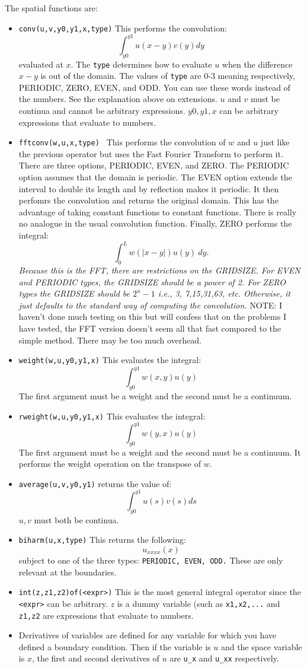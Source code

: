 The spatial  functions are:
\begin{itemize}
\item  {\tt conv(u,v,y0,y1,x,type)} This performs the convolution:
\[
 \int_{y0}^{y1}u(x-y)v(y) dy
\]
evaluated at $x.$  The {\tt type} determines how to evaluate $u$ when
the difference $x-y$ is out of the domain.  The values of {\tt type}
are 0-3 meaning respectively, PERIODIC, ZERO, EVEN, and ODD.  You can
use these words instead of the numbers. 
 See the explanation above on extensions.
$u$ and $v$ must be
continua and cannot be arbitrary expressions. $y0,y1,x$ can be
arbitrary expressions that evaluate to numbers.
\item { \tt fftconv(w,u,x,type) }  This performs the convolution of
$w$ and $u$ just like the previous operator but uses the Fast Fourier
Transform to perform it.  There are three options, PERIODIC, EVEN, and
ZERO.  The PERIODIC option assumes that the domain is periodic.  The
EVEN option extends the interval to double its length and by
reflection makes it periodic.  It then perfomrs the convolution and
returns the original domain.  This has the advantage of taking
constant functions to constant functions.  There is really no analogue
in the usual convolution function.  Finally, ZERO performs the
integral:
\[
   \int_0^L w(|x-y|) u(y) \ dy. 
\]
{\em  Because this is the FFT, there are restrictions on the GRIDSIZE.
For EVEN and PERIODIC types, the GRIDSIZE should be a power of 2.  For
ZERO types the GRIDSIZE should be $2^n -1$ i.e.,  3, 7,15,31,63,
etc. Otherwise, it just defaults to the standard way of computing the
convolution. 
}
NOTE:  I haven't done much testing on this but will confess that
on the problems I have tested, the FFT version doesn't seem all that 
fast compared to the simple method.  There may be too much overhead.  


\item {\tt weight(w,u,y0,y1,x)} This evaluates the integral:
\[
\int_{y0}^{y1} w(x,y)u(y)
\]
The first argument must be a weight and the second must be a continuum.
\item {\tt rweight(w,u,y0,y1,x)} This evaluates the integral:
\[
\int_{y0}^{y1} w(y,x)u(y)
\]
The first argument must be a weight and the second must be a
continuum. It performs the weight operation on the transpose of $w.$
\item {\tt average(u,v,y0,y1)} returns the value of:
\[
\int_{y0}^{y1} u(s)v(s)ds
\]
$u,v$ must both be continua.
\item {\tt biharm(u,x,type)} This returns the following:
\[
 u_{xxxx}(x)
\]
subject to one of the three types: {\tt  PERIODIC, EVEN, ODD.}
 These are only
relevant at the boundaries.   
\item {\tt int(z,z1,z2)of(<expr>)}  This is the most general integral
operator since the {\tt <expr>} can be arbitrary. $z$ is a dummy
variable (such as {\tt x1,x2,...} and {\tt z1,z2} are expressions that
evaluate to numbers.
\item Derivatives of variables are defined for any variable for which
you have defined a boundary condition.  Then if the variable is $u$
and the space variable is $x$, the first and second derivatives of $u$
are  {\tt u\_x} and {\tt u\_xx} respectively.
\end{itemize}

